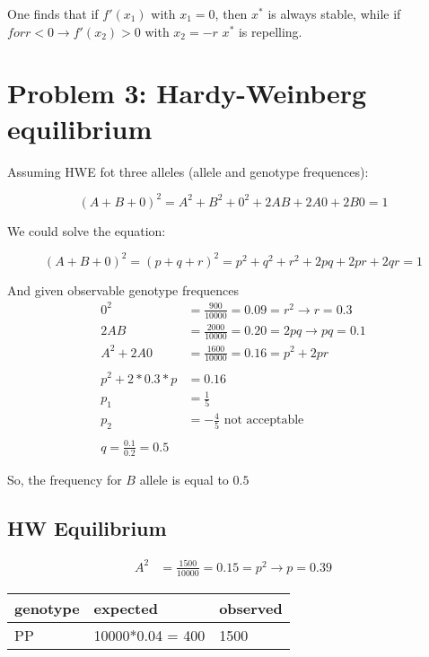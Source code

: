 One finds that if $ f'(x_1) $ with $x_1 = 0$, then $x^{\ast}$ is always stable, while if $ for r < 0 \rightarrow f'(x_2) > 0 $ with $x_2 = -r $ $x^{\ast}$ is repelling.



\setcounter{chapter}{3}
\setcounter{section}{0}
\section{Problem 3: Hardy-Weinberg equilibrium}
Assuming HWE fot three alleles (allele and genotype frequences):

\[  (A+B+0)^2 = A^2 + B^2 + 0^2 + 2AB + 2A0 + 2B0 = 1  \]

We could solve the equation: 

\[  (A+B+0)^2 = (p+q+r)^2 = p^2 + q^2 + r^2 + 2pq + 2pr + 2qr = 1  \]

And given observable genotype frequences
\begin{align}
0^2 &= \frac{900}{10000} = 0.09 = r^2 \rightarrow r = 0.3 \\
2AB &= \frac{2000}{10000} = 0.20 = 2pq \rightarrow pq = 0.1 \\
A^2 + 2A0 &= \frac{1600}{10000} = 0.16 = p^2 + 2pr\\
\\
p^2+2*0.3*p &= 0.16 \\
p_1 &= \frac{1}{5} \\
p_2 &= -\frac{4}{5} \text{~not acceptable}\\
\\
q = \frac{0.1}{0.2} = 0.5
\end{align}

So, the frequency for $B$ allele is equal to $0.5$

\subsection{HW Equilibrium}

\begin{align}
A^2 &= \frac{1500}{10000} = 0.15 = p^2 \rightarrow p = 0.39 
\end{align}
\begin{center}
\begin{tabular}{|l|l|l|}
\hline genotype & expected & observed \\ 
\hline PP & 10000*0.04 = 400 & 1500 \\ 
\hline 
\end{tabular} 
\end{center}

